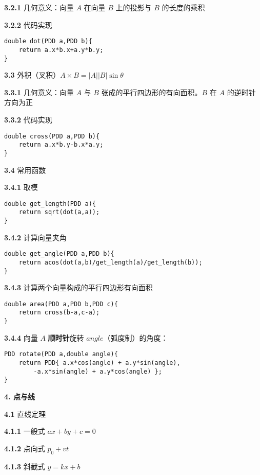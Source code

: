 \documentclass[12pt]{article}
\begin{document}
\textbf{3.2.1} 几何意义：向量 $A$ 在向量 $B$ 上的投影与 $B$ 的长度的乘积
		
\textbf{3.2.2} 代码实现

\begin{lstlisting}[style=C++]
double dot(PDD a,PDD b){
	return a.x*b.x+a.y*b.y;
}
\end{lstlisting}

\textbf{3.3} 外积（叉积）$A\times B=|A||B|\sin\theta$

\textbf{3.3.1} 几何意义：向量 $A$ 与 $B$ 张成的平行四边形的有向面积。$B$ 在 $A$ 的逆时针方向为正
		
\textbf{3.3.2} 代码实现

\begin{lstlisting}[style=C++]
double cross(PDD a,PDD b){
	return a.x*b.y-b.x*a.y;
}
\end{lstlisting}

\textbf{3.4} 常用函数

\textbf{3.4.1} 取模

\begin{lstlisting}[style=C++]
double get_length(PDD a){
	return sqrt(dot(a,a));
}
\end{lstlisting}

\textbf{3.4.2} 计算向量夹角

\begin{lstlisting}[style=C++]
double get_angle(PDD a,PDD b){
	return acos(dot(a,b)/get_length(a)/get_length(b));
}
\end{lstlisting}

\textbf{3.4.3} 计算两个向量构成的平行四边形有向面积

\begin{lstlisting}[style=C++]
double area(PDD a,PDD b,PDD c){
	return cross(b-a,c-a);
}
\end{lstlisting}

\textbf{3.4.4} 向量 $A$ \textbf{顺时针}旋转 $angle$（弧度制）的角度：

\begin{lstlisting}[style=C++]
PDD rotate(PDD a,double angle){
	return PDD{ a.x*cos(angle) + a.y*sin(angle),
		-a.x*sin(angle) + a.y*cos(angle) };
}
\end{lstlisting}

\textbf{4. 点与线}

\textbf{4.1} 直线定理

\textbf{4.1.1} 一般式 $ax+by+c=0$

\textbf{4.1.2} 点向式 $p_0+vt$

\textbf{4.1.3} 斜截式 $y=kx+b$
\end{document}

